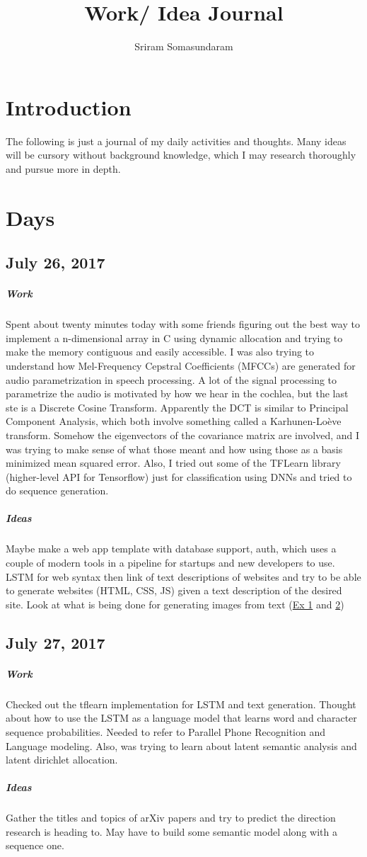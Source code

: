 \documentclass[a4paper]{article}
\title{Work/ Idea Journal}
\author{Sriram Somasundaram}
\date{}
\begin{document}
\maketitle

\section{Introduction}

The following is just a journal of my daily activities and thoughts. Many ideas will be cursory without background knowledge, which I may research thoroughly and pursue more in depth.

\section{Days}

\subsection{July 26, 2017}
\subparagraph{Work}
Spent about twenty minutes today with some friends figuring out the best way to implement a n-dimensional array in C using dynamic allocation and trying to make the memory contiguous and easily accessible. I was also trying to understand how Mel-Frequency Cepstral Coefficients (MFCCs) are generated for audio parametrization in speech processing. A lot of the signal processing to parametrize the audio is motivated by how we hear in the cochlea, but the last ste is a Discrete Cosine Transform. Apparently the DCT is similar to Principal Component Analysis, which both involve something called a Karhunen-Loève transform. Somehow the eigenvectors of the covariance matrix are involved, and I was trying to make sense of what those meant and how using those as a basis minimized mean squared error. Also, I tried out some of the TFLearn library (higher-level API for Tensorflow) just for classification using DNNs and tried to do sequence generation.
\subparagraph{Ideas}
Maybe make a web app template with database support, auth, which uses a couple of modern tools in a pipeline for startups and new developers to use. LSTM for web syntax then link of text descriptions of websites and try to be able to generate websites (HTML, CSS, JS) given a text description of the desired site. Look at what is being done for generating images from text (\href{https://arxiv.org/pdf/1605.05396.pdf}{Ex 1} and \href{https://arxiv.org/pdf/1511.02793.pdf}{2})


\subsection{July 27, 2017}
\subparagraph{Work}
Checked out the tflearn implementation for LSTM and text generation. Thought about how to use the LSTM as a language model that learns word and character sequence probabilities. Needed to refer to Parallel Phone Recognition and Language modeling. Also, was trying to learn about latent semantic analysis and latent dirichlet allocation.
\subparagraph{Ideas}
Gather the titles and topics of arXiv papers and try to predict the direction research is heading to. May have to build some semantic model along with a sequence one.
\end{document}
